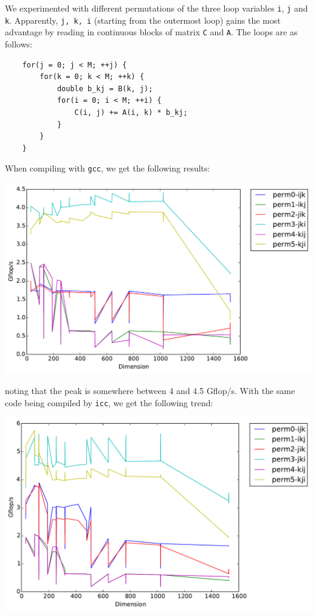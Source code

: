 \documentclass[11pt]{article}
\begin{document}
We experimented with different permutations of the three loop variables \texttt{i}, \texttt{j} and \texttt{k}. Apparently, \texttt{j, k, i} (starting from the outermost loop) gains the most advantage by reading in continuous blocks of matrix \texttt{C} and \texttt{A}. The loops are as follows:

\begin{lstlisting}
    for(j = 0; j < M; ++j) {
        for(k = 0; k < M; ++k) {
            double b_kj = B(k, j);
            for(i = 0; i < M; ++i) {
                C(i, j) += A(i, k) * b_kj;
            }
        }
    }
\end{lstlisting}

When compiling with \texttt{gcc}, we get the following results:

\begin{center}
    \includegraphics[scale=0.5]{benchmarking/permutations/gcc/timing.pdf}
\end{center}

\noindent noting that the peak is somewhere between 4 and 4.5 Gflop/s.  With the same code being compiled by \texttt{icc}, we get the following trend:

\begin{center}
    \includegraphics[scale=0.5]{benchmarking/permutations/icc/timing.pdf}
\end{center}
\end{document}
